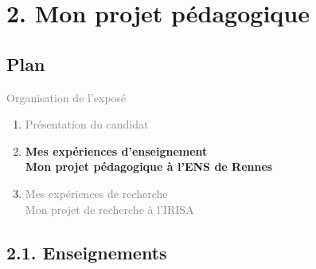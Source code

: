 \documentclass[11pt,english,ignorenonframetext,]{beamer}
\begin{document}




\section{\hfill{}2. Mon projet pédagogique\hfill{}}

\subsection{\hfill{}Plan\hfill{}}

\begin{frame}{\textcolor{gray}{Organisation de l'exposé}}

\begin{enumerate}
  \item
\textcolor{gray}{
  Présentation du candidat
}
\vspace*{25pt}


\item
\alert{\textbf{%
  Mes expériences d'enseignement\\
  Mon projet pédagogique à l'ENS de Rennes
}}
\vspace*{25pt}

\item
\textcolor{gray}{
  Mes expériences de recherche\\
  Mon projet de recherche à l'IRISA
}
\end{enumerate}

\end{frame}


\subsection{\hfill{}2.1. Enseignements\hfill{}}
\end{document}
